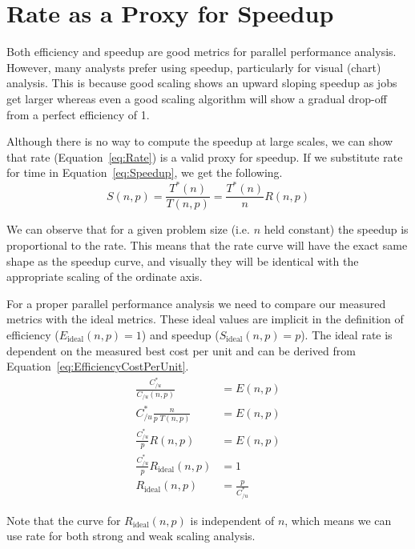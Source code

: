 \documentclass[conference]{IEEEtran}
\begin{document}
\section{Rate as a Proxy for Speedup}
\label{sec:RateProxy}

\noindent
Both efficiency and speedup are good metrics for parallel performance
analysis. However, many analysts prefer using speedup, particularly for
visual (chart) analysis. This is because good scaling shows an upward
sloping speedup as jobs get larger whereas even a good scaling algorithm
will show a gradual drop-off from a perfect efficiency of 1.

Although there is no way to compute the speedup at large scales, we can
show that rate (Equation~\ref{eq:Rate}) is a valid proxy for speedup. If we
substitute rate for time in Equation~\ref{eq:Speedup}, we get the
following.
\begin{equation}
  S(n,p) = \frac{T^*(n)}{T(n,p)} = \frac{T^*(n)}{n} R(n,p)
  \label{eq:SpeedupFromRate}
\end{equation}

We can observe that for a given problem size (i.e. $n$ held constant) the
speedup is proportional to the rate. This means that the rate curve will
have the exact same shape as the speedup curve, and visually they will be
identical with the appropriate scaling of the ordinate axis.

For a proper parallel performance analysis we need to compare our measured
metrics with the ideal metrics. These ideal values are implicit in the
definition of efficiency ($E_\mathrm{ideal}(n,p) = 1$) and speedup
($S_\mathrm{ideal}(n,p) = p$). The ideal rate is dependent on the measured
best cost per unit and can be derived from
Equation~\ref{eq:EfficiencyCostPerUnit}.
\begingroup
\addtolength{\jot}{1ex} %
\begin{align}
  \frac{C_{/u}^*}{C_{/u}(n,p)} &= E(n,p) \nonumber \\
  C_{/u}^* \frac{n}{p \; T(n,p)} &= E(n,p) \nonumber \\
  \frac{C_{/u}^*}{p} R(n,p) &= E(n,p) \nonumber \\
  \frac{C_{/u}^*}{p} R_\mathrm{ideal}(n,p) &= 1 \nonumber \\
  R_\mathrm{ideal}(n,p) &= \frac{p}{C_{/u}^*}
\end{align}
\endgroup

Note that the curve for $R_\mathrm{ideal}(n,p)$ is independent of $n$,
which means we can use rate for both strong and weak scaling analysis.
\end{document}
